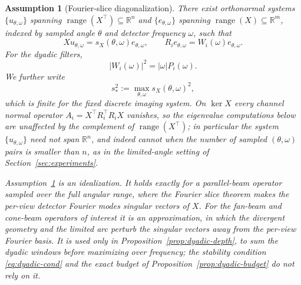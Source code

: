 \documentclass{article}
\newcommand{\R}{\mathbb{R}}
\newtheorem{assumption}[theorem]{Assumption}
\begin{document}
\begin{assumption}[Fourier-slice diagonalization]
\label{assu:fourier_slice}
There exist orthonormal systems
$\{u_{\theta,\omega}\}$ spanning $\operatorname{range}(X^\top)\subseteq\R^n$ and
$\{e_{\theta,\omega}\}$ spanning $\operatorname{range}(X)\subseteq\R^m$, indexed by sampled angle
$\theta$ and detector frequency $\omega$, such that
\begin{equation}
\label{eq:fourier_slice}
Xu_{\theta,\omega}
=
s_X(\theta,\omega)e_{\theta,\omega},
\qquad
R_ie_{\theta,\omega}
=
W_i(\omega)e_{\theta,\omega}.
\end{equation}
For the dyadic filters,
\[
|W_i(\omega)|^2
=
|\omega|P_i(\omega).
\]
We further write
\[
s_*^2
:=
\max_{\theta,\omega}
s_X(\theta,\omega)^2,
\]
which is finite for the fixed discrete imaging system. On $\ker X$ every channel normal operator $A_i=X^\top R_i^\top R_iX$ vanishes, so the eigenvalue computations below are unaffected by the complement of $\operatorname{range}(X^\top)$; in particular the system $\{u_{\theta,\omega}\}$ need not span $\R^n$, and indeed cannot when the number of sampled $(\theta,\omega)$ pairs is smaller than $n$, as in the limited-angle setting of Section~\ref{sec:experiments}.

Assumption~\ref{assu:fourier_slice} is an idealization. It holds exactly for a parallel-beam operator sampled over the full angular range, where the Fourier slice theorem makes the per-view detector Fourier modes singular vectors of $X$. For the fan-beam and cone-beam operators of interest it is an approximation, in which the divergent geometry and the limited arc perturb the singular vectors away from the per-view Fourier basis. It is used only in Proposition~\ref{prop:dyadic-depth}, to sum the dyadic windows before maximizing over frequency; the stability condition \eqref{eq:dyadic-cond} and the exact budget of Proposition~\ref{prop:dyadic-budget} do not rely on it.
\end{assumption}
\end{document}

